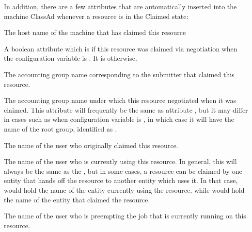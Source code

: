 In addition, there are a few attributes that are automatically
inserted into the machine ClassAd whenever a resource is in the
Claimed state:

\begin{description}

\item[\AdAttr{ClientMachine}:] The host name of the machine that has
claimed this resource

\item[\AdAttr{RemoteAutoregroup}:]  A boolean attribute which is 
if this resource was claimed via negotiation 
when the configuration variable  is .
It is  otherwise.

\item[\AdAttr{RemoteGroup}:]  The accounting group name corresponding to
the submitter that claimed this resource.

\item[\AdAttr{RemoteNegotiatingGroup}:]  The accounting group name under
which this resource negotiated when it was claimed.  This attribute will
frequently be the same as attribute ,
but it may differ in cases such
as when configuration variable  is ,
in which case it will have the name of the root group, 
identified as .

\item[\AdAttr{RemoteOwner}:] The name of the user who originally
claimed this resource.

\item[\AdAttr{RemoteUser}:] The name of the user who is currently
using this resource.
In general, this will always be the same as the ,
but in some cases, a resource can be claimed by one entity that hands
off the resource to another entity which uses it.
In that case,  would hold the name of the entity
currently using the resource, while  would hold
the name of the entity that claimed the resource.

\item[\AdAttr{PreemptingOwner}:] The name of the user who is preempting
the job that is currently running on this resource.


\end{description}
